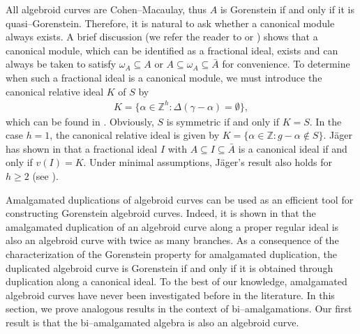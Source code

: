 \documentclass{amsart}%
\theoremstyle{plain}
\numberwithin{equation}{section}
\theoremstyle{definition}
\begin{document}
    All algebroid curves are Cohen--Macaulay, thus $A$ is Gorenstein if and only if it is quasi--Gorenstein. Therefore, it is natural to ask whether a canonical module always exists. A brief discussion (we refer the reader to \cite{Gorenstein} or \cite{dannacan}) shows that a canonical module, which can be identified as a fractional ideal, exists and can always be taken to satisfy $\omega_A\subseteq A$ or $A\subseteq\omega_A\subseteq \bar{A}$ for convenience. To determine when such a fractional ideal is a canonical module, we must introduce the canonical relative ideal $K$ of $S$ by
    \begin{align*}
        K=\{\alpha \in \mathbb{Z}^h: \Delta(\gamma-\alpha)=\emptyset\},
    \end{align*}
    which can be found in \cite{dannacan}. Obviously, $S$ is symmetric if and only if $K=S$. In the case $h=1$, the canonical relative ideal is given by $K=\{\alpha\in \mathbb{Z}:g-\alpha\notin S\}$. Jäger has shown in \cite{Jager} that a fractional ideal $I$ with $A\subseteq I \subseteq \bar{A}$ is a canonical ideal if and only if $v(I)=K$. Under minimal assumptions, Jäger's result also holds for $h\ge2$ (see \cite{dannacan}).\medskip

    Amalgamated duplications of algebroid curves can be used as an efficient tool for constructing Gorenstein algebroid curves. Indeed, it is shown in \cite{Gorenstein} that the amalgamated duplication of an algebroid curve along a proper regular ideal is also an algebroid curve with twice as many branches. As a consequence of the characterization of the Gorenstein property for amalgamated duplication, the duplicated algebroid curve is Gorenstein if and only if it is obtained through duplication along a canonical ideal. To the best of our knowledge, amalgamated algebroid curves have never been investigated before in the literature. In this section, we prove analogous results in the context of bi--amalgamations. Our first result is that the bi--amalgamated algebra is also an algebroid curve.
\end{document}
